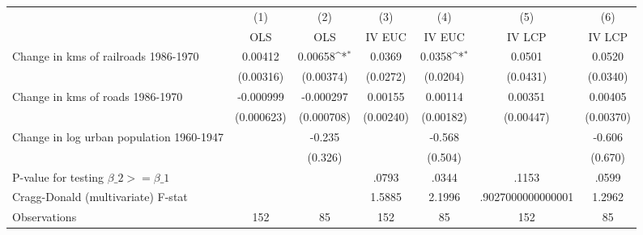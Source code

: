 {
\def\sym#1{\ifmmode^{#1}\else\(^{#1}\)\fi}
\begin{tabular}{l*{6}{c}}
\hline\hline
                &\multicolumn{1}{c}{(1)}&\multicolumn{1}{c}{(2)}&\multicolumn{1}{c}{(3)}&\multicolumn{1}{c}{(4)}&\multicolumn{1}{c}{(5)}&\multicolumn{1}{c}{(6)}\\
                &\multicolumn{1}{c}{OLS}&\multicolumn{1}{c}{OLS}&\multicolumn{1}{c}{IV EUC}&\multicolumn{1}{c}{IV EUC}&\multicolumn{1}{c}{IV LCP}&\multicolumn{1}{c}{IV LCP}\\
\hline
Change in kms of railroads 1986-1970&  0.00412         &  0.00658\sym{*}  &   0.0369         &   0.0358\sym{*}  &   0.0501         &   0.0520         \\
                &(0.00316)         &(0.00374)         & (0.0272)         & (0.0204)         & (0.0431)         & (0.0340)         \\
[1em]
Change in kms of roads 1986-1970&-0.000999         &-0.000297         &  0.00155         &  0.00114         &  0.00351         &  0.00405         \\
                &(0.000623)         &(0.000708)         &(0.00240)         &(0.00182)         &(0.00447)         &(0.00370)         \\
[1em]
Change in log urban population 1960-1947&                  &   -0.235         &                  &   -0.568         &                  &   -0.606         \\
                &                  &  (0.326)         &                  &  (0.504)         &                  &  (0.670)         \\
\hline
P-value for testing $\beta\_{2} >= \beta\_{1}$&                  &                  &    .0793         &    .0344         &    .1153         &    .0599         \\
Cragg-Donald (multivariate) F-stat&                  &                  &   1.5885         &   2.1996         &.9027000000000001         &   1.2962         \\
Observations    &      152         &       85         &      152         &       85         &      152         &       85         \\
\hline\hline
\end{tabular}
}
